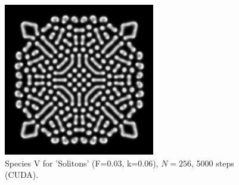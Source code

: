 \documentclass[9pt]{IEEEtran} %
\begin{document}
\begin{figure}[H]
    \centering
    \includegraphics[width=0.7\columnwidth]{Solitons.png} %
    \caption{Species V for 'Solitons' (F=0.03, k=0.06), $N=256$, 5000 steps (CUDA).}
    \label{fig:vis_example}
\end{figure}
\end{document}
